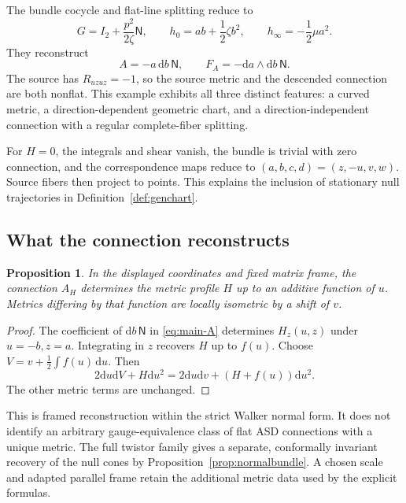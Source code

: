 \documentclass[11pt]{article}
\numberwithin{equation}{section}
\newtheorem{proposition}[theorem]{Proposition}
\theoremstyle{definition}
\theoremstyle{remark}
\newcommand{\dd}{\mathrm d}
\newcommand{\NN}{\mathsf N}
\newcommand{\II}{I_2}
\begin{document}
The bundle cocycle and flat-line splitting reduce to
\begin{equation}\label{eq:quadraticsplit}
G=\II+\frac{p^2}{2\zeta}\NN,
\qquad h_0=ab+\frac12\zeta b^2,
\qquad h_\infty=-\frac12\mu a^2.
\end{equation}
They reconstruct
\begin{equation}\label{eq:quadraticA}
A=-a\,\dd b\,\NN,\qquad F_A=-\dd a\wedge\dd b\,\NN.
\end{equation}
The source has $R_{uzuz}=-1$, so the source metric and the descended connection are both nonflat. This example exhibits all three distinct features: a curved metric, a direction-dependent geometric chart, and a direction-independent connection with a regular complete-fiber splitting.

For $H=0$, the integrals and shear vanish, the bundle is trivial with zero connection, and the correspondence maps reduce to $(a,b,c,d)=(z,-u,v,w)$. Source fibers then project to points. This explains the inclusion of stationary null trajectories in Definition~\ref{def:genchart}.

\subsection{What the connection reconstructs}

\begin{proposition}\label{prop:recovery}
In the displayed coordinates and fixed matrix frame, the connection $A_H$ determines the metric profile $H$ up to an additive function of $u$. Metrics differing by that function are locally isometric by a shift of $v$.
\end{proposition}
\begin{proof}
The coefficient of $\dd b\,\NN$ in \eqref{eq:main-A} determines $H_z(u,z)$ under $u=-b,z=a$. Integrating in $z$ recovers $H$ up to $f(u)$. Choose $V=v+\tfrac12\int f(u)\,\dd u$. Then
\[
2\dd u\dd V+H\dd u^2
=2\dd u\dd v+(H+f(u))\dd u^2.
\]
The other metric terms are unchanged.
\end{proof}

This is framed reconstruction within the strict Walker normal form. It does not identify an arbitrary gauge-equivalence class of flat ASD connections with a unique metric. The full twistor family gives a separate, conformally invariant recovery of the null cones by Proposition~\ref{prop:normalbundle}. A chosen scale and adapted parallel frame retain the additional metric data used by the explicit formulas.
\end{document}
